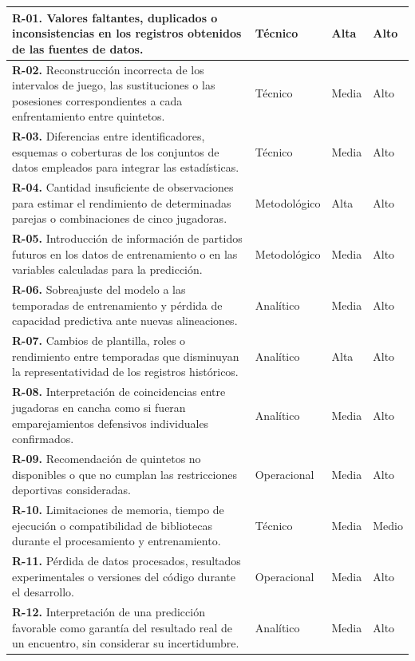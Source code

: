 \begin{longtable}{@{}p{6.1cm}p{2.65cm}p{2.1cm}p{1.85cm}@{}}
\textbf{R-01.} Valores faltantes, duplicados o inconsistencias en los registros obtenidos de las fuentes de datos. & Técnico & Alta & Alto\\
\midrule
\textbf{R-02.} Reconstrucción incorrecta de los intervalos de juego, las sustituciones o las posesiones correspondientes a cada enfrentamiento entre quintetos. & Técnico & Media & Alto\\
\midrule
\textbf{R-03.} Diferencias entre identificadores, esquemas o coberturas de los conjuntos de datos empleados para integrar las estadísticas. & Técnico & Media & Alto\\
\midrule
\textbf{R-04.} Cantidad insuficiente de observaciones para estimar el rendimiento de determinadas parejas o combinaciones de cinco jugadoras. & Metodológico & Alta & Alto\\
\midrule
\textbf{R-05.} Introducción de información de partidos futuros en los datos de entrenamiento o en las variables calculadas para la predicción. & Metodológico & Media & Alto\\
\midrule
\textbf{R-06.} Sobreajuste del modelo a las temporadas de entrenamiento y pérdida de capacidad predictiva ante nuevas alineaciones. & Analítico & Media & Alto\\
\midrule
\textbf{R-07.} Cambios de plantilla, roles o rendimiento entre temporadas que disminuyan la representatividad de los registros históricos. & Analítico & Alta & Alto\\
\midrule
\textbf{R-08.} Interpretación de coincidencias entre jugadoras en cancha como si fueran emparejamientos defensivos individuales confirmados. & Analítico & Media & Alto\\
\midrule
\textbf{R-09.} Recomendación de quintetos no disponibles o que no cumplan las restricciones deportivas consideradas. & Operacional & Media & Alto\\
\midrule
\textbf{R-10.} Limitaciones de memoria, tiempo de ejecución o compatibilidad de bibliotecas durante el procesamiento y entrenamiento. & Técnico & Media & Medio\\
\midrule
\textbf{R-11.} Pérdida de datos procesados, resultados experimentales o versiones del código durante el desarrollo. & Operacional & Media & Alto\\
\midrule
\textbf{R-12.} Interpretación de una predicción favorable como garantía del resultado real de un encuentro, sin considerar su incertidumbre. & Analítico & Media & Alto\\

\end{longtable}


